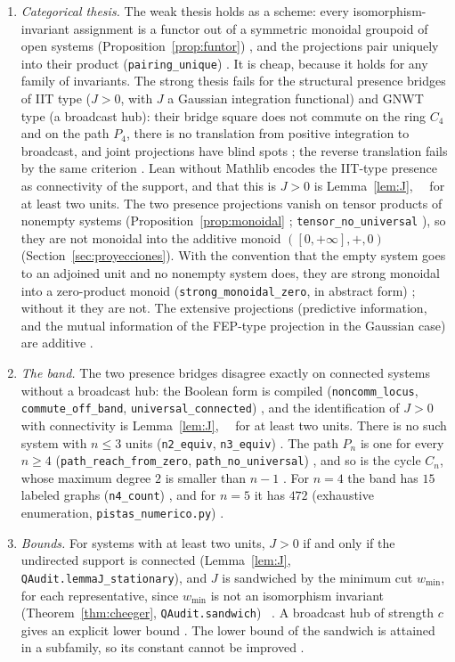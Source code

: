 \begin{enumerate}
\item[(R3)] \emph{Categorical thesis.} The weak thesis holds as a scheme: every isomorphism-invariant assignment is a functor out of a symmetric monoidal groupoid of open systems (Proposition~\ref{prop:funtor}) \stA, and the projections pair uniquely into their product (\texttt{pairing\_unique}) \stL. It is cheap, because it holds for any family of invariants. The strong thesis fails for the structural presence bridges of IIT type ($J>0$, with $J$ a Gaussian integration functional) and GNWT type (a broadcast hub): their bridge square does not commute on the ring $C_4$ and on the path $P_4$, there is no translation from positive integration to broadcast, and joint projections have blind spots \stL; the reverse translation fails by the same criterion \stA. Lean without Mathlib encodes the IIT-type presence as connectivity of the support, and that this is $J>0$ is Lemma~\ref{lem:J}, \stA\ \stM\ for at least two units. The two presence projections vanish on tensor products of nonempty systems (Proposition~\ref{prop:monoidal} \stA; \texttt{tensor\_no\_universal} \stL), so they are not monoidal into the additive monoid $([0,+\infty],+,0)$ (Section~\ref{sec:proyecciones}). With the convention that the empty system goes to an adjoined unit and no nonempty system does, they are strong monoidal into a zero-product monoid (\texttt{strong\_monoidal\_zero}, in abstract form) \stL; without it they are not. The extensive projections (predictive information, and the mutual information of the FEP-type projection in the Gaussian case) are additive \stA.
\item[(R4)] \emph{The band.} The two presence bridges disagree exactly on connected systems without a broadcast hub: the Boolean form is compiled (\texttt{noncomm\_locus}, \texttt{commute\_off\_band}, \texttt{universal\_connected}) \stL, and the identification of $J>0$ with connectivity is Lemma~\ref{lem:J}, \stA\ \stM\ for at least two units. There is no such system with $n\le3$ units (\texttt{n2\_equiv}, \texttt{n3\_equiv}) \stL. The path $P_n$ is one for every $n\ge4$ (\texttt{path\_reach\_from\_zero}, \texttt{path\_no\_universal}) \stL, and so is the cycle $C_n$, whose maximum degree $2$ is smaller than $n-1$ \stA. For $n=4$ the band has $15$ labeled graphs (\texttt{n4\_count}) \stL, and for $n=5$ it has $472$ (exhaustive enumeration, \texttt{pistas\_numerico.py}) \stS.
\item[(R5)] \emph{Bounds.} For systems with at least two units, $J>0$ if and only if the undirected support is connected (Lemma~\ref{lem:J}, \texttt{QAudit.\allowbreak lemmaJ\_stationary}), and $J$ is sandwiched by the minimum cut $w_{\min}$, for each representative, since $w_{\min}$ is not an isomorphism invariant (Theorem~\ref{thm:cheeger}, \texttt{QAudit.\allowbreak sandwich}) \stA\ \stM. A broadcast hub of strength $c$ gives an explicit lower bound \stA. The lower bound of the sandwich is attained in a subfamily, so its constant cannot be improved \stS.

\end{enumerate}
